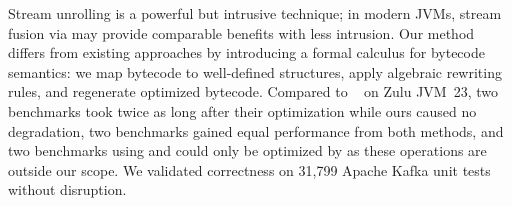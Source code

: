 
Stream unrolling is a powerful but intrusive technique; in modern JVMs, stream fusion via  may provide comparable benefits with less intrusion.
Our method differs from existing approaches by introducing a formal calculus for bytecode semantics: we map bytecode to well-defined structures, apply algebraic rewriting rules, and regenerate optimized bytecode.
Compared to \streamliner{}~\citep{moller2020eliminating} on Zulu JVM~23, two benchmarks took twice as long after their optimization while ours caused no degradation, two benchmarks gained equal performance from both methods, and two benchmarks using  and  could only be optimized by \streamliner{} as these operations are outside our scope.
We validated correctness on 31,799 Apache Kafka unit tests without disruption.
